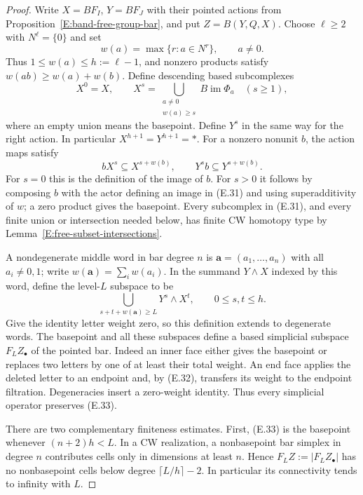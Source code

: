 \begin{proof}
Write $X=BF_I$, $Y=BF_J$ with their pointed actions from
Proposition~\ref{E:band-free-group-bar}, and put
$Z=B(Y,Q,X)$.  Choose $\ell\geq2$ with $N^\ell=\{0\}$ and set
\[
 w(a)=\max\{r:a\in N^r\},\qquad a\ne0.
\]
Thus $1\leq w(a)\leq h:=\ell-1$, and nonzero products satisfy
$w(ab)\geq w(a)+w(b)$.  Define descending based subcomplexes
\[
 X^0=X,\qquad
 X^s=\bigcup_{\substack{a\ne0\\w(a)\geq s}}
          B\operatorname{im}\Phi_a\quad(s\geq1),       \tag{E.31}
\]
where an empty union means the basepoint.  Define $Y^s$ in the same
way for the right action.  In particular $X^{h+1}=Y^{h+1}=*$.
For a nonzero nonunit $b$, the action maps satisfy
\[
 bX^s\subseteq X^{s+w(b)},\qquad
 Y^s b\subseteq Y^{s+w(b)}.                             \tag{E.32}
\]
For $s=0$ this is the definition of the image of $b$.  For $s>0$ it
follows by composing $b$ with the actor defining an image in (E.31)
and using superadditivity of $w$; a zero product gives the basepoint.
Every subcomplex in (E.31), and every finite union or intersection
needed below, has finite CW homotopy type by
Lemma~\ref{E:free-subset-intersections}.

A nondegenerate middle word in bar degree $n$ is
$\mathbf a=(a_1,\ldots,a_n)$ with all $a_i\ne0,1$; write
$w(\mathbf a)=\sum_iw(a_i)$.  In the summand $Y\wedge X$ indexed by
this word, define the level-$L$ subspace to be
\[
 \bigcup_{s+t+w(\mathbf a)\geq L}Y^s\wedge X^t,
 \qquad 0\leq s,t\leq h.                              \tag{E.33}
\]
Give the identity letter weight zero, so this definition extends to
degenerate words.  The basepoint and all these subspaces define a
based simplicial subspace $F_LZ_\bullet$ of the pointed bar.
Indeed an inner face either gives the basepoint or replaces two
letters by one of at least their total weight.  An end face applies
the deleted letter to an endpoint and, by (E.32), transfers its
weight to the endpoint filtration.  Degeneracies insert a zero-weight
identity.  Thus every simplicial operator preserves (E.33).

There are two complementary finiteness estimates.  First, (E.33)
is the basepoint whenever $(n+2)h<L$.  In a CW realization, a
nonbasepoint bar simplex in degree $n$ contributes cells only in
dimensions at least $n$.  Hence $F_LZ:=|F_LZ_\bullet|$ has no
nonbasepoint cells below degree $\lceil L/h\rceil-2$.
In particular its connectivity tends to infinity with $L$.


\end{proof}
